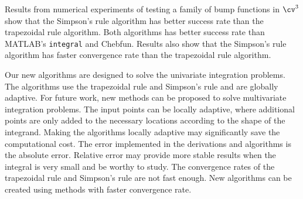 \documentclass{iitthesis}
\theoremstyle{definition}
\theoremstyle{remark}
\begin{document}
Results from numerical experiments of testing a family of bump functions in $\cv^3$ show that the Simpson's rule algorithm has better success rate than the trapezoidal rule algorithm. Both algorithms has better success rate than MATLAB's {\tt integral} and Chebfun. Results also show that the Simpson's rule algorithm has faster convergence rate than the trapezoidal rule algorithm.


Our new algorithms are designed to solve the univariate integration problems. The algorithms use the trapezoidal rule and Simpson's rule and are globally adaptive. For future work, new methods can be proposed to solve multivariate integration problems. The input points can be locally adaptive, where additional points are only added to the necessary locations according to the shape of the integrand. Making the algorithms locally adaptive may significantly save the computational cost. The error implemented in the derivations and algorithms is the absolute error. Relative error may provide more stable results when the integral is very small and be worthy to study. The convergence rates of the trapezoidal rule and Simpson's rule are not fast enough. New algorithms can be created using methods with faster convergence rate.



\clearpage


%
%
%
%
%
%
%
%
%
%
%
%

%


\end{document}
